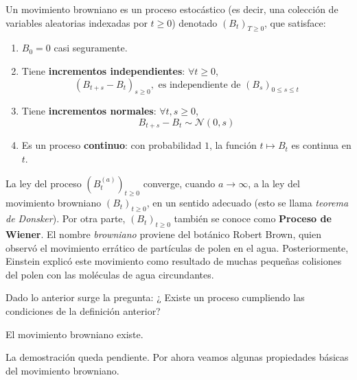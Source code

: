 \begin{definition}
        \label{def:mb}
        Un movimiento browniano es un proceso estocástico (es decir, una colección de variables 
        aleatorias indexadas por $t \geq 0$) denotado $(B_t)_{T \geq 0}$, que satisface:
        
        \renewcommand{\labelenumi}{\roman{enumi})}
        \begin{enumerate}
                \item $B_0 = 0$ casi seguramente.
                \item Tiene \textbf{incrementos independientes}: $\forall  t\geq 0$,
                        \begin{equation*}
                                (B_{t+s} - B_t)_{s \geq 0}, \text{ es
                                independiente de } (B_{s})_{0 \leq s \leq t}
                        \end{equation*}
                \item Tiene \textbf{incrementos normales}: $\forall  t,s \geq 0$,
                        \begin{equation*}
                                B_{t+s} - B_t \sim \mathcal{N}(0,s)
                        \end{equation*}
                \item Es un proceso \textbf{continuo}: con probabilidad $1$, la función $t \mapsto B_t$ es 
                        continua en $t$.
        \end{enumerate}
\end{definition}

La ley del proceso $(B_{t}^{(a)})_{t \geq 0}$ converge, cuando $a \rightarrow \infty$, a la ley del 
movimiento browniano $(B_t)_{t \geq 0}$, en un sentido adecuado (esto se llama \textit{teorema de Donsker}). 
Por otra parte, $(B_t)_{t \geq 0}$ también se conoce como \textbf{Proceso de
Wiener}. El nombre \textit{browniano} proviene del botánico Robert Brown, quien
observó el movimiento errático de partículas de polen en el agua. Posteriormente, Einstein explicó este 
movimiento como resultado de muchas pequeñas colisiones del polen con las moléculas de agua circundantes.

Dado lo anterior surge la pregunta: ¿ Existe un proceso cumpliendo las condiciones de la definición anterior?

\begin{theorem}
    \label{teo:mb}
    El movimiento browniano existe.
\end{theorem}
La demostración queda pendiente. Por ahora veamos algunas propiedades básicas del movimiento browniano.

